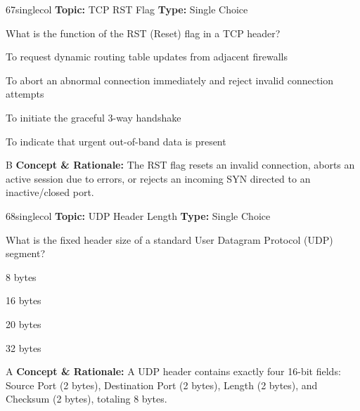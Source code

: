 \begin{qcard}{67}{singlecol}
\textcolor{darkslate!75}{\small\textbf{Topic:} TCP RST Flag \hfill \textbf{Type:} Single Choice}\vspace{0.4em}\par
What is the function of the RST (Reset) flag in a TCP header?
\begin{qoptions}
\item To request dynamic routing table updates from adjacent firewalls
\item To abort an abnormal connection immediately and reject invalid connection attempts
\item To initiate the graceful 3-way handshake
\item To indicate that urgent out-of-band data is present
\end{qoptions}
\end{qcard}
\nopagebreak
\begin{explainbox}{B}
\textbf{Concept \& Rationale:} The RST flag resets an invalid connection, aborts an active session due to errors, or rejects an incoming SYN directed to an inactive/closed port.
\end{explainbox}

\begin{qcard}{68}{singlecol}
\textcolor{darkslate!75}{\small\textbf{Topic:} UDP Header Length \hfill \textbf{Type:} Single Choice}\vspace{0.4em}\par
What is the fixed header size of a standard User Datagram Protocol (UDP) segment?
\begin{qoptions}
\item 8 bytes
\item 16 bytes
\item 20 bytes
\item 32 bytes
\end{qoptions}
\end{qcard}
\nopagebreak
\begin{explainbox}{A}
\textbf{Concept \& Rationale:} A UDP header contains exactly four 16-bit fields: Source Port (2 bytes), Destination Port (2 bytes), Length (2 bytes), and Checksum (2 bytes), totaling 8 bytes.
\end{explainbox}

